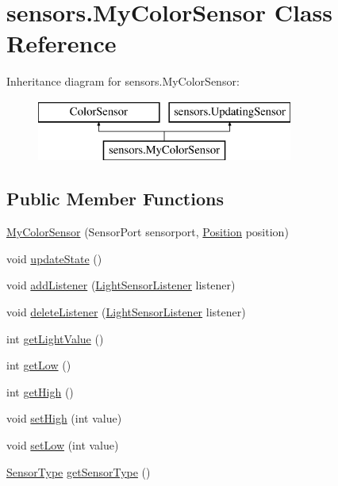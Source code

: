 \hypertarget{classsensors_1_1_my_color_sensor}{\section{sensors.\-My\-Color\-Sensor Class Reference}
\label{classsensors_1_1_my_color_sensor}
}
Inheritance diagram for sensors.\-My\-Color\-Sensor\-:\begin{figure}[H]
\begin{center}
\leavevmode
\includegraphics[height=2.000000cm]{classsensors_1_1_my_color_sensor}
\end{center}
\end{figure}
\subsection*{Public Member Functions}
\begin{DoxyCompactItemize}
\item 
\hyperlink{classsensors_1_1_my_color_sensor_a9058deb72ccfa0f38def0b10e971be76}{My\-Color\-Sensor} (Sensor\-Port sensorport, \hyperlink{enumsensors_1_1_position}{Position} position)
\item 
void \hyperlink{classsensors_1_1_my_color_sensor_a17324aa0de8fa9ab45bb2c1450e0119a}{update\-State} ()
\item 
void \hyperlink{classsensors_1_1_my_color_sensor_aed2d2c661c0d980695bbfc4bb21a9f2f}{add\-Listener} (\hyperlink{interfacesensors_1_1_light_sensor_listener}{Light\-Sensor\-Listener} listener)
\item 
void \hyperlink{classsensors_1_1_my_color_sensor_a2cc8382833eeb064afde388d243efe08}{delete\-Listener} (\hyperlink{interfacesensors_1_1_light_sensor_listener}{Light\-Sensor\-Listener} listener)
\item 
int \hyperlink{classsensors_1_1_my_color_sensor_aa61cdd8b3ed7ab6355a79173949d816d}{get\-Light\-Value} ()
\item 
int \hyperlink{classsensors_1_1_my_color_sensor_a33a47875addf7ccd00aa6fa63e5a9219}{get\-Low} ()
\item 
int \hyperlink{classsensors_1_1_my_color_sensor_aa988dadec2aafa7fcf6636b12244ef1a}{get\-High} ()
\item 
void \hyperlink{classsensors_1_1_my_color_sensor_a1dc583efb6f3f4e978af6d52c8a702b0}{set\-High} (int value)
\item 
void \hyperlink{classsensors_1_1_my_color_sensor_a8929a9791cbdc348082600c01a63f17a}{set\-Low} (int value)
\item 
\hyperlink{enumsensors_1_1_sensor_type}{Sensor\-Type} \hyperlink{classsensors_1_1_my_color_sensor_a62eaf9476cb88ab8e77f720e7953c6cd}{get\-Sensor\-Type} ()
\end{DoxyCompactItemize}



